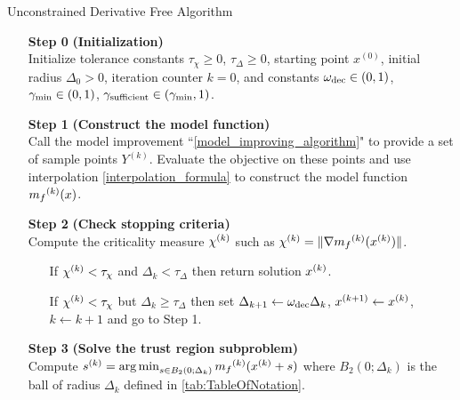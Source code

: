 \begin{algorithm}[H]
    \caption{Unconstrained Derivative Free Algorithm}
    \label{unconstrained_dfo}
    \begin{itemize}
        \item[\textbf{Step 0}] \textbf{(Initialization)} \\
            Initialize tolerance constants $\tau_{\chi} \ge 0$, $\tau_{\Delta} \ge 0$, starting point $x^{(0)}$, initial radius $\Delta_0 > 0$, iteration counter $k=0$, and constants $\omega_{\text{dec}} \in (0, 1)$, $ \gamma_{\text{min}} \in (0, 1)$, $\gamma_{\text{sufficient}} \in (\gamma_{\text{min}}, 1)$.
            
        \item[\textbf{Step 1}] \textbf{(Construct the model function)} \\
            Call the model improvement ``\cref{model_improving_algorithm}" to provide a set of sample points $Y^{(k)}$.
            Evaluate the objective on these points and use interpolation \cref{interpolation_formula} to construct the model function ${{m}_f}^{(k)}(x)$.
        
        \item[\textbf{Step 2}] \textbf{(Check stopping criteria)} \\
            Compute the criticality measure ${\chi^{(k)}}$ such as ${\chi^{(k)}} = \|\nabla{{m}_f}^{(k)}({x^{(k)}})\|$. \begin{itemize}
                \item[] If $ {\chi^{(k)}} < \tau_{\chi} $ and $\Delta_k<\tau_{\Delta}$ then return solution ${x^{(k)}}$.
                \item[] If $ {\chi^{(k)}} < \tau_{\chi} $ but $\Delta_k\ge\tau_{\Delta}$ then  
                set $\Delta_{k+1} \gets \omega_{\text{dec}}\Delta_{k}$, 
                $x^{(k+1)} \gets {x^{(k)}}$,
                $k \gets k+1$ and go to Step 1.
            \end{itemize}
        
        \item[\textbf{Step 3}] \textbf{(Solve the trust region subproblem)} \\
            Compute ${{s}^{(k)}} = \operatorname*{arg\,min}_{s\in B_2(0; \Delta_k)} {{m}_f}^{(k)} ({x^{(k)}} + s)$ where $B_2(0; \Delta_k)$ is the ball of radius $\Delta_k$ defined in \cref{tab:TableOfNotation}.
            

\end{itemize}
\end{algorithm}
